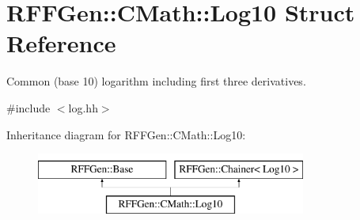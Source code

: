 \hypertarget{structRFFGen_1_1CMath_1_1Log10}{\section{R\-F\-F\-Gen\-:\-:C\-Math\-:\-:Log10 Struct Reference}
\label{structRFFGen_1_1CMath_1_1Log10}
}


Common (base 10) logarithm including first three derivatives.  




{\ttfamily \#include $<$log.\-hh$>$}

Inheritance diagram for R\-F\-F\-Gen\-:\-:C\-Math\-:\-:Log10\-:\begin{figure}[H]
\begin{center}
\leavevmode
\includegraphics[height=2.000000cm]{structRFFGen_1_1CMath_1_1Log10}
\end{center}
\end{figure}
